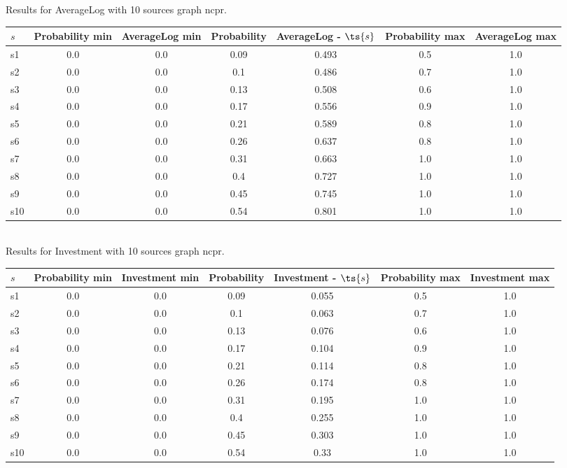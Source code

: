 \documentclass{article}
\begin{document}
\noindent Results for AverageLog with 10 sources graph ncpr.

\noindent\begin{tabular}{|l|c|c|c|c|c|c|}
\hline
$s$& Probability min & AverageLog min & Probability & AverageLog - $\ts{s}$ & Probability max & AverageLog max\\
\hline
s1 &0.0 & 0.0 & 0.09 & 0.493 & 0.5 & 1.0\\
\hline
s2 &0.0 & 0.0 & 0.1 & 0.486 & 0.7 & 1.0\\
\hline
s3 &0.0 & 0.0 & 0.13 & 0.508 & 0.6 & 1.0\\
\hline
s4 &0.0 & 0.0 & 0.17 & 0.556 & 0.9 & 1.0\\
\hline
s5 &0.0 & 0.0 & 0.21 & 0.589 & 0.8 & 1.0\\
\hline
s6 &0.0 & 0.0 & 0.26 & 0.637 & 0.8 & 1.0\\
\hline
s7 &0.0 & 0.0 & 0.31 & 0.663 & 1.0 & 1.0\\
\hline
s8 &0.0 & 0.0 & 0.4 & 0.727 & 1.0 & 1.0\\
\hline
s9 &0.0 & 0.0 & 0.45 & 0.745 & 1.0 & 1.0\\
\hline
s10 &0.0 & 0.0 & 0.54 & 0.801 & 1.0 & 1.0\\
\hline
\end{tabular}\\

\noindent Results for Investment with 10 sources graph ncpr.

\noindent\begin{tabular}{|l|c|c|c|c|c|c|}
\hline
$s$& Probability min & Investment min & Probability & Investment - $\ts{s}$ & Probability max & Investment max\\
\hline
s1 &0.0 & 0.0 & 0.09 & 0.055 & 0.5 & 1.0\\
\hline
s2 &0.0 & 0.0 & 0.1 & 0.063 & 0.7 & 1.0\\
\hline
s3 &0.0 & 0.0 & 0.13 & 0.076 & 0.6 & 1.0\\
\hline
s4 &0.0 & 0.0 & 0.17 & 0.104 & 0.9 & 1.0\\
\hline
s5 &0.0 & 0.0 & 0.21 & 0.114 & 0.8 & 1.0\\
\hline
s6 &0.0 & 0.0 & 0.26 & 0.174 & 0.8 & 1.0\\
\hline
s7 &0.0 & 0.0 & 0.31 & 0.195 & 1.0 & 1.0\\
\hline
s8 &0.0 & 0.0 & 0.4 & 0.255 & 1.0 & 1.0\\
\hline
s9 &0.0 & 0.0 & 0.45 & 0.303 & 1.0 & 1.0\\
\hline
s10 &0.0 & 0.0 & 0.54 & 0.33 & 1.0 & 1.0\\
\hline
\end{tabular}\\
\end{document}
